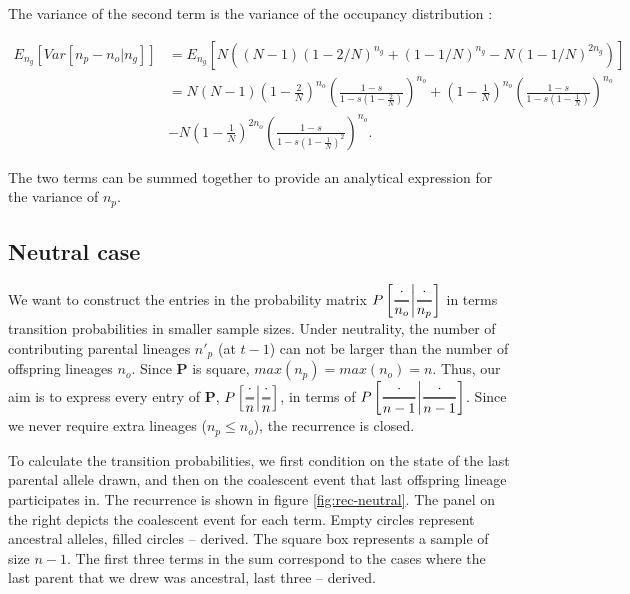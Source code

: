 \documentclass[review]{elsarticle}
\newcommand{\Dfrac}[2]{%
  \ooalign{%
    $\genfrac{}{}{1.2pt}0{#1}{#2}$\cr%
    $\color{white}\genfrac{}{}{.4pt}0{\phantom{#1}}{\phantom{#2}}$}%
}
\newcommand{\cond}{\middle\vert}
\newcommand{\sgcomment}[1]{{\color{red}{SG: #1}}}
\begin{document}
The variance of the second term is the variance of the occupancy distribution \cite{}:

\begin{equation}
\begin{split}
E_{n_g}\left[Var\left[n_p-n_o | n_g \right]\right] & = E_{n_g}\left[N ((N - 1) (1 - 2/N)^{n_g} + (1 - 1/N)^{n_g} - N (1 - 1/N)^{2 n_g}) \right] \\
& = N (N-1)  \left(1-\frac{2}{N}\right)^{n_o} \left(\frac{1-s}{1-s  \left(1-\frac{2}{N}\right)}\right)^{n_o} +  \left(1-\frac{1}{N}\right)^{n_o} \left(\frac{1-s}{1-s  \left(1-\frac{1}{N}\right)}\right)^{n_o} \\
&-N  \left(1-\frac{1}{N}\right)^{2n_o} \left(\frac{1-s}{1-s  \left(1-\frac{1}{N}\right)^2}\right)^{n_o}. 
\end{split}
\end{equation}

The two terms can be summed together to provide an analytical expression for the variance of $n_p$. 

\subsection{Neutral case}

We want to construct the entries in the probability matrix
$P\left[ \Dfrac{\cdot}{n_o} \cond \Dfrac{\cdot}{n_p} \right]$ in terms transition probabilities in
smaller sample sizes. Under neutrality, the number of contributing parental lineages $n'_p$ (at
$t-1$) can not be larger than the number of offspring lineages $n_o$. Since $\mathbf{P}$ is square,
$max(n_p)=max(n_o)=n$. Thus, our aim is to express every entry of $\mathbf{P}$,
$P\left[ \Dfrac{\cdot}{n} \cond\Dfrac{\cdot}{n} \right]$, in terms of
$P\left[ \Dfrac{\cdot}{n-1} \cond \Dfrac{\cdot}{n-1} \right]$. Since we never require extra lineages
($n_p\le n_o$), the recurrence is closed.

To calculate the transition probabilities, we first condition on the state of the last parental
allele drawn, and then on the coalescent event that last offspring lineage participates in. The
recurrence is shown in figure \ref{fig:rec-neutral}. The panel on the right depicts the coalescent
event for each term. Empty circles represent ancestral alleles, filled circles -- derived. The
square box represents a sample of size $n-1$. The first three terms in the sum correspond to the
cases where the last parent that we drew was ancestral, last three -- derived.
\sgcomment{Would it be worth presenting the non-square transition probabilites as well to prepare the reader for what comes next with selection}
\end{document}
